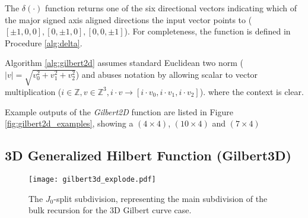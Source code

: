 %
%
%

The $\delta(\cdot)$ function returns one of the six directional vectors indicating which of
the major signed axis aligned directions the input vector points to ($[\pm1,0,0], [0,\pm1,0],[0,0,\pm1]$).
For completeness, the function is defined in Procedure \ref{alg:delta}.

Algorithm \ref{alg:gilbert2d} assumes standard Euclidean two norm ($|v| = \sqrt{v_0^2 + v_1^2 + v_2^2}$)
and abuses notation by allowing scalar to vector multiplication ($i \in \mathbb{Z}, v \in \mathbb{Z}^3, i \cdot v \to [ i \cdot v_0, i \cdot v_1, i \cdot v_2 ]$).
where the context is clear.

Example outputs of the \textit{Gilbert2D} function are listed in Figure \ref{fig:gilbert2d_examples}, showing a $(4 \times 4)$, $(10 \times 4)$ and $(7 \times 4)$


\subsection{3D Generalized Hilbert Function (Gilbert3D)}


\begin{figure}[h]
  \centering
  \texttt{[image: gilbert3d\_explode.pdf]}
  \caption{ The $J_0$-split subdivision, representing the main subdivision of the bulk recursion for the 3D Gilbert curve case. }
  \label{fig:gilbert3DJSplit}
\end{figure}

